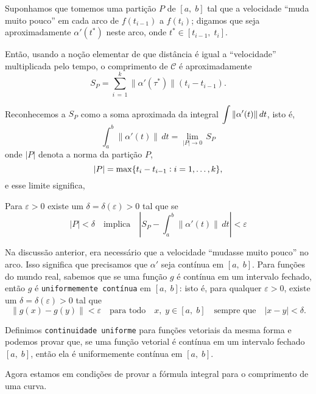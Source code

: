 Suponhamos que tomemos uma partição \(P\) de \([a,\; b]\) tal que a velocidade ``muda muito 
pouco'' em cada arco de \(f(t_{i-1})\) a \(f(t_{i})\); digamos que seja aproximadamente 
\(\alpha'(t^{\ast})\) neste arco, onde \(t^{\ast} \in [t_{i-1},\; t_{i}]\).

Então, usando a noção elementar de que distância é igual a ``velocidade'' multiplicada pelo 
tempo, o comprimento de \(\mathcal{C}\) é aproximadamente
\begin{equation*}
S_{P}=\sum_{i\,=\, 1}^{k}\|\alpha'(\tau^{\ast})\|(t_{i}-t_{i-1}).
\end{equation*}

Reconhecemos a \(S_{P}\) como a soma aproximada da integral \(\displaystyle \int\|\alpha'(t)\|\,dt\), isto é,
\begin{equation*}
\int_{a}^{b}\|\alpha'(t)\|\,dt=\lim_{|P|\to 0}\, S_{P}
\end{equation*}
onde \(|P|\) denota a norma da partição \(P\),
\begin{equation*}
|P|=\max \{t_{i}-t_{i-1}\vcentcolon i = 1,\ldots, k\},
\end{equation*}
e esse limite significa,

Para \(\varepsilon >0\) existe um \(\delta =\delta(\varepsilon) >0\) tal que se
\begin{equation*}
|P| < \delta \quad \text{implica}\quad \left|S_{P}-\int_{a}^{b}\|\alpha'(t)\|\,dt\right| < \varepsilon
\end{equation*} 

Na discussão anterior, era necessário que a velocidade ``mudasse muito pouco'' no arco. Isso 
significa que precisamos que \(\alpha'\) seja contínua em \([a,\; b]\). Para funções do mundo 
real, sabemos que se uma função \(g\) é contínua em um intervalo fechado, então \(g\) é 
\texttt{uniformemente contínua} em \([a,\; b]\): isto é, para qualquer \(\varepsilon > 0\), 
existe um \(\delta=\delta(\varepsilon) > 0\) tal que
\begin{equation*}
\|g(x)-g(y)\| < \varepsilon\quad  \text{para todo}\quad  x,\; y \in [a,\; b]\quad  \text{sempre que}\quad  |x-y| < \delta.
\end{equation*}

Definimos \texttt{continuidade uniforme} para funções vetoriais da mesma forma e podemos provar 
que, se uma função vetorial é contínua em um intervalo fechado \([a,\; b]\), então ela é uniformemente  contínua  em \([a,\; b]\).

Agora estamos em condições de provar a fórmula integral para o comprimento de uma curva.


